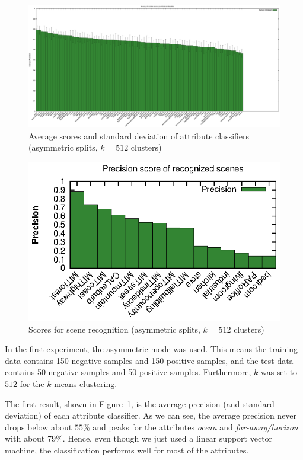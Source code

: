 \documentclass{vldb}
\begin{document}
\begin{figure}[ht]
  \centering
  \includegraphics[width = \textwidth]{figs/scores_asymmetric_512classes.eps}
  \caption{Average scores and standard deviation of attribute classifiers
    (asymmetric splits, $k = 512$ clusters)
  }
  \label{fig:scores-classifiers-asymmetric-512}
\end{figure}

\begin{figure}[ht]
  \centering
  \includegraphics[width = .45\textwidth]{figs/scores_sr_asymmetric_512classes.eps}
  \caption{Scores for scene recognition \newline (asymmetric splits, $k=512$ clusters)}
  \label{fig:scores-scene-rec-asymmetric-512}
\end{figure}

In the first experiment, the asymmetric mode was used. This means the training
data contains 150 negative samples and 150 positive samples, and the test data
contains 50 negative samples and 50 positive samples. Furthermore, $k$ was set
to $512$ for the $k$-means clustering.

The first result, shown in Figure~\ref{fig:scores-classifiers-asymmetric-512},
is the average precision (and standard deviation) of each attribute classifier.
As we can see, the average precision never drops below about $55$\% and peaks
for the attributes \emph{ocean} and \emph{far-away/horizon} with about $79$\%.
Hence, even though we just used a linear support vector machine, the
classification performs well for most of the attributes.
\end{document}
